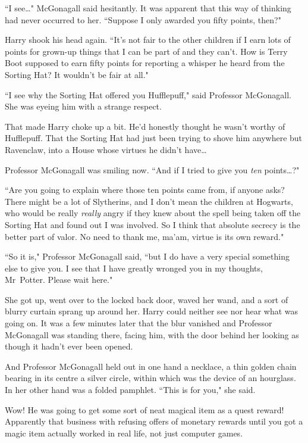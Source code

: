 ``I see{\ldots}" McGonagall said hesitantly. It was apparent that this way of thinking had never occurred to her. ``Suppose I only awarded you fifty points, then?"

Harry shook his head again. ``It's not fair to the other children if I earn lots of points for grown-up things that I can be part of and they can't. How is Terry Boot supposed to earn fifty points for reporting a whisper he heard from the Sorting Hat? It wouldn't be fair at all."

``I see why the Sorting Hat offered you Hufflepuff," said Professor McGonagall. She was eyeing him with a strange respect.

That made Harry choke up a bit. He'd honestly thought he wasn't worthy of Hufflepuff. That the Sorting Hat had just been trying to shove him anywhere but Ravenclaw, into a House whose virtues he didn't have{\ldots}

Professor McGonagall was smiling now. ``And if I tried to give you \emph{ten} points{\ldots}?"

``Are you going to explain where those ten points came from, if anyone asks? There might be a lot of Slytherins, and I don't mean the children at Hogwarts, who would be really \emph{really} angry if they knew about the spell being taken off the Sorting Hat and found out I was involved. So I think that absolute secrecy is the better part of valor. No need to thank me, ma'am, virtue is its own reward."

``So it is," Professor McGonagall said, ``but I do have a very special something else to give you. I see that I have greatly wronged you in my thoughts, Mr~Potter. Please wait here."

She got up, went over to the locked back door, waved her wand, and a sort of blurry curtain sprang up around her. Harry could neither see nor hear what was going on. It was a few minutes later that the blur vanished and Professor McGonagall was standing there, facing him, with the door behind her looking as though it hadn't ever been opened.

And Professor McGonagall held out in one hand a necklace, a thin golden chain bearing in its centre a silver circle, within which was the device of an hourglass. In her other hand was a folded pamphlet. ``This is for you," she said.

Wow! He was going to get some sort of neat magical item as a quest reward! Apparently that business with refusing offers of monetary rewards until you got a magic item actually worked in real life, not just computer games.

